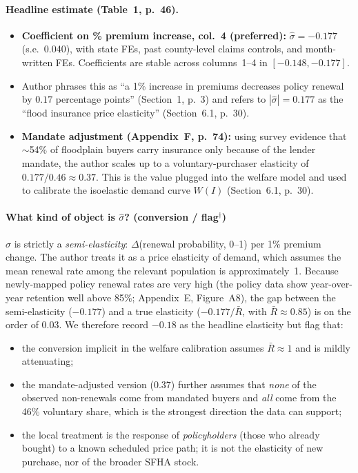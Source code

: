 \documentclass[11pt]{article}
\begin{document}
\paragraph{Headline estimate (Table~1, p.~46).}
\begin{itemize}
\item \textbf{Coefficient on \% premium increase, col.~4 (preferred):}
$\hat\sigma = -0.177$ (s.e.\ 0.040), with state FEs, past county-level
claims controls, and month-written FEs. Coefficients are stable across
columns~1--4 in $[-0.148, -0.177]$.
\item Author phrases this as ``a 1\% increase in premiums decreases policy
renewal by $0.17$ percentage points'' (Section~1, p.~3) and refers to
$|\hat\sigma|=0.177$ as the ``flood insurance price elasticity'' (Section~6.1,
p.~30).
\item \textbf{Mandate adjustment (Appendix~F, p.~74):} using survey
evidence that $\sim$54\% of floodplain buyers carry insurance only because
of the lender mandate, the author scales up to a voluntary-purchaser
elasticity of $0.177/0.46 \approx 0.37$. This is the value plugged into
the welfare model and used to calibrate the isoelastic demand curve $W(I)$
(Section~6.1, p.~30).
\end{itemize}

\paragraph{What kind of object is $\hat\sigma$? (conversion / flag$^\dagger$)}
$\hat\sigma$ is strictly a \emph{semi-elasticity}: $\Delta$(renewal probability,
0--1) per 1\% premium change. The author treats it as a price elasticity
of demand, which assumes the mean renewal rate among the relevant
population is approximately~1. Because newly-mapped policy renewal rates
are very high (the policy data show year-over-year retention well above
85\%; Appendix~E, Figure~A8), the gap between the semi-elasticity
($-0.177$) and a true elasticity ($-0.177/\bar{R}$, with $\bar{R}\approx 0.85$)
is on the order of $0.03$. We therefore record $-0.18$ as the headline
elasticity but flag that:
\begin{itemize}
\item the conversion implicit in the welfare calibration assumes
$\bar{R}\approx 1$ and is mildly attenuating;
\item the mandate-adjusted version ($0.37$) further assumes that
\emph{none} of the observed non-renewals come from mandated buyers and
\emph{all} come from the 46\% voluntary share, which is the strongest
direction the data can support;
\item the local treatment is the response of \emph{policyholders} (those
who already bought) to a known scheduled price path; it is not the
elasticity of new purchase, nor of the broader SFHA stock.
\end{itemize}
\end{document}
